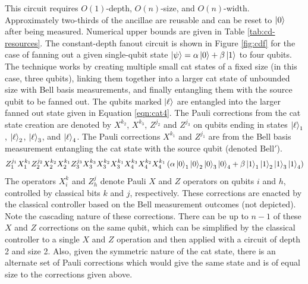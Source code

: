 \documentclass[twoside]{article}
\begin{document}
This circuit requires $O(1)$-depth, $O(n)$-size, and $O(n)$-width. Approximately
two-thirds of the ancillae are reusable and can be reset to $\left\vert{0}\right\rangle$ after
being measured. Numerical upper bounds are given in Table \ref{tab:cd-resources}.
The constant-depth fanout circuit is shown in Figure \ref{fig:cdf} for the case of fanning out a given single-qubit state
$\left\vert{\psi}\right\rangle = \alpha\left\vert{0}\right\rangle + \beta\left\vert{1}\right\rangle$ to four qubits.
The technique works by creating multiple small
cat states of a fixed size (in this case, three qubits), linking them
together into a larger cat state of unbounded size with Bell basis measurements,
and finally entangling them with the source qubit to be fanned out.
The qubits marked $\left\vert{\ell}\right\rangle$ are
entangled into the larger fanned out state given in Equation \ref{eqn:cat4}.
The Pauli corrections from the cat state creation are denoted by
$X^{k_2}$, $X^{k_3}$, $Z^{j_2}$ and $Z^{j_3}$ on qubits ending in
states $\left\vert{\ell}\right\rangle_1$, $\left\vert{\ell}\right\rangle_2$,
$\left\vert{\ell}\right\rangle_3$, and $\left\vert{\ell}\right\rangle_4$. The Pauli corrections
$X^{k_1}$ and $Z^{j_1}$ are from the Bell basis measurement
entangling the cat state with the source qubit (denoted $\text{Bell}'$).
\begin{equation}
Z_1^{j_1}X_1^{k_1}Z_2^{j_2}X_2^{k_2}X_2^{k_1}Z_{3}^{j_3}X_{3}^{k_3}X_{3}^{k_2}X_{3}^{k_1}X_{4}^{k_3}X_{4}^{k_2}X_{4}^{k_1}
\left(\alpha \left\vert{0}\right\rangle_1\left\vert{0}\right\rangle_2\left\vert{0}\right\rangle_3\left\vert{0}\right\rangle_4 + \beta \left\vert{1}\right\rangle_1\left\vert{1}\right\rangle_2\left\vert{1}\right\rangle_3\left\vert{1}\right\rangle_4 \right)
\label{eqn:cat4}
\end{equation}
%
The operators $X^k_i$ and $Z^j_{h}$ denote Pauli $X$ and $Z$ operators
on qubits $i$ and $h$, controlled by classical bits $k$ and $j$,
respectively. These corrections are enacted by the classical controller based on
the Bell measurement outcomes (not depicted).
Note the cascading nature of these corrections.
There can be up to
$n-1$ of these $X$ and $Z$
corrections on the same qubit, which can be simplified by the classical
controller to a single $X$ and $Z$ operation and then applied with a circuit of
depth 2 and size 2. Also, given the symmetric nature of the cat state, there
is an alternate set of Pauli corrections which would give the same state and
is of equal size to the corrections given above.
\end{document}
